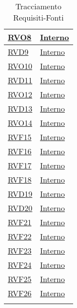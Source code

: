 \begin{longtable}{|>{\centering}m{5cm}|m{5cm}<{\centering}|}
\hyperlink{RVO8}{RVO8} & \hyperlink{Interno}{Interno}\\ \hline

\hyperlink{RVD9}{RVD9} & \hyperlink{Interno}{Interno}\\ \hline

\hyperlink{RVO10}{RVO10} & \hyperlink{Interno}{Interno}\\ \hline

\hyperlink{RVD11}{RVD11} & \hyperlink{Interno}{Interno}\\ \hline

\hyperlink{RVO12}{RVO12} & \hyperlink{Interno}{Interno}\\ \hline

\hyperlink{RVD13}{RVD13} & \hyperlink{Interno}{Interno}\\ \hline

\hyperlink{RVO14}{RVO14} & \hyperlink{Interno}{Interno}\\ \hline

\hyperlink{RVF15}{RVF15} & \hyperlink{Interno}{Interno}\\ \hline

\hyperlink{RVF16}{RVF16} & \hyperlink{Interno}{Interno}\\ \hline

\hyperlink{RVF17}{RVF17} & \hyperlink{Interno}{Interno}\\ \hline

\hyperlink{RVF18}{RVF18} & \hyperlink{Interno}{Interno}\\ \hline

\hyperlink{RVD19}{RVD19} & \hyperlink{Interno}{Interno}\\ \hline

\hyperlink{RVD20}{RVD20} & \hyperlink{Interno}{Interno}\\ \hline

\hyperlink{RVF21}{RVF21} & \hyperlink{Interno}{Interno}\\ \hline

\hyperlink{RVF22}{RVF22} & \hyperlink{Interno}{Interno}\\ \hline

\hyperlink{RVF23}{RVF23} & \hyperlink{Interno}{Interno}\\ \hline

\hyperlink{RVF24}{RVF24} & \hyperlink{Interno}{Interno}\\ \hline

\hyperlink{RVF25}{RVF25} & \hyperlink{Interno}{Interno}\\ \hline

\hyperlink{RVF26}{RVF26} & \hyperlink{Interno}{Interno}\\ \hline

\caption[Tracciamento Requisiti-Fonti]{Tracciamento Requisiti-Fonti}
\label{tabella:requi-fonti}
\end{longtable}
\clearpage
